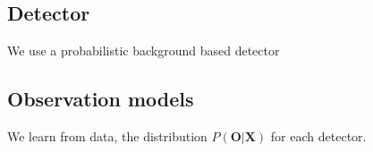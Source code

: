 
\subsection{Detector}
We use a probabilistic background based detector
\subsection{Observation models}
We learn from data, the distribution $P(\textbf{O}|\textbf{X})$ for each detector. 

